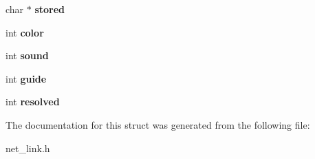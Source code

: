 \begin{DoxyCompactItemize}
\item 
\hypertarget{structdescriptor__data_a36944ed512a40615f0a39804bed0c3d4}{char $\ast$ {\bfseries stored}}\label{structdescriptor__data_a36944ed512a40615f0a39804bed0c3d4}

\item 
\hypertarget{structdescriptor__data_a34a2bfdbe6e2cdb52bad91413c9e7a67}{int {\bfseries color}}\label{structdescriptor__data_a34a2bfdbe6e2cdb52bad91413c9e7a67}

\item 
\hypertarget{structdescriptor__data_a4df84b4d0904061291a9ba551a9d424b}{int {\bfseries sound}}\label{structdescriptor__data_a4df84b4d0904061291a9ba551a9d424b}

\item 
\hypertarget{structdescriptor__data_a9bcd32f58a9593550160a419a9fc4aa7}{int {\bfseries guide}}\label{structdescriptor__data_a9bcd32f58a9593550160a419a9fc4aa7}

\item 
\hypertarget{structdescriptor__data_a22c9f52e9771fe61935171d09b9b525d}{int {\bfseries resolved}}\label{structdescriptor__data_a22c9f52e9771fe61935171d09b9b525d}

\end{DoxyCompactItemize}


The documentation for this struct was generated from the following file\-:\begin{DoxyCompactItemize}
\item 
net\-\_\-link.\-h\end{DoxyCompactItemize}
